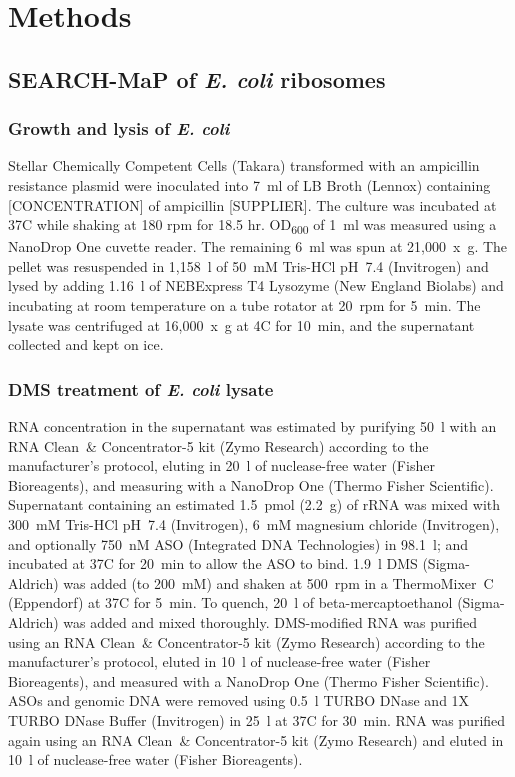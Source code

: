 \documentclass[main.tex]{subfiles}
\begin{document}
\section{Methods}
\label{methods}


\subsection{SEARCH-MaP of \textit{E. coli} ribosomes}

\subsubsection{Growth and lysis of \textit{E. coli}}

Stellar Chemically Competent Cells (Takara) transformed with an ampicillin resistance plasmid were inoculated into 7~ml of LB Broth (Lennox) containing [CONCENTRATION] of ampicillin [SUPPLIER].
The culture was incubated at 37\textdegree C while shaking at 180 rpm for 18.5 hr.
OD\textsubscript{600} of 1~ml was measured using a NanoDrop One cuvette reader.
The remaining 6~ml was spun at 21,000~x~g.
The pellet was resuspended in 1,158~\textmu l of 50~mM Tris-HCl pH~7.4 (Invitrogen) and lysed by adding 1.16~\textmu l of NEBExpress T4 Lysozyme (New England Biolabs) and incubating at room temperature on a tube rotator at 20~rpm for 5~min.
The lysate was centrifuged at 16,000~x~g at 4\textdegree C for 10~min, and the supernatant collected and kept on ice.

\subsubsection{DMS treatment of \textit{E. coli} lysate}

RNA concentration in the supernatant was estimated by purifying 50~\textmu l with an RNA Clean~\& Concentrator-5 kit (Zymo Research) according to the manufacturer's protocol, eluting in 20~\textmu l of nuclease-free water (Fisher Bioreagents), and measuring with a NanoDrop One (Thermo Fisher Scientific).
Supernatant containing an estimated 1.5~pmol (2.2~\textmu g) of rRNA was mixed with 300~mM Tris-HCl pH~7.4 (Invitrogen), 6~mM magnesium chloride (Invitrogen), and optionally 750~nM ASO (Integrated DNA Technologies) in 98.1~\textmu l; and incubated at 37\textdegree C for 20~min to allow the ASO to bind.
1.9~\textmu l DMS (Sigma-Aldrich) was added (to 200~mM) and shaken at 500~rpm in a ThermoMixer~C (Eppendorf) at 37\textdegree C for 5~min.
To quench, 20~\textmu l of beta-mercaptoethanol (Sigma-Aldrich) was added and mixed thoroughly.
DMS-modified RNA was purified using an RNA Clean~\& Concentrator-5 kit (Zymo Research) according to the manufacturer's protocol, eluted in 10~\textmu l of nuclease-free water (Fisher Bioreagents), and measured with a NanoDrop One (Thermo Fisher Scientific).
ASOs and genomic DNA were removed using 0.5~\textmu l TURBO DNase and 1X TURBO DNase Buffer (Invitrogen) in 25~\textmu l at 37\textdegree C for 30~min.
RNA was purified again using an RNA Clean~\& Concentrator-5 kit (Zymo Research) and eluted in 10~\textmu l of nuclease-free water (Fisher Bioreagents).
\end{document}

